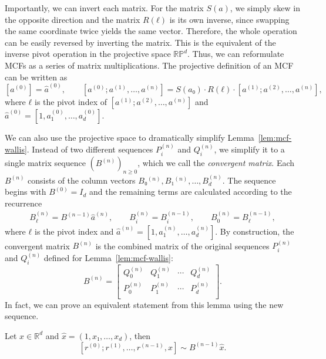 Importantly, we can invert each matrix.
For the matrix $S(a)$, we simply skew in the opposite direction
and the matrix $R(ℓ)$ is its own inverse, since swapping the same coordinate
twice yields the same vector.
Therefore, the whole operation can be easily reversed by inverting the matrix.
This is the equivalent of the inverse pivot operation in the projective space $\mathbb{RP}^d$.
Thus, we can reformulate MCFs as a series of matrix multiplications.
The projective definition of an MCF can be written as
\[
  [a^{(0)}] = \hat a^{(0)}, \qquad
  [a^{(0)}; a^{(1)}, …, a^{(n)}] = S(a₀) · R(ℓ) · [a^{(1)}; a^{(2)}, …, a^{(n)}],
\]
where $ℓ$ is the pivot index of $[a^{(1)}; a^{(2)}, …, a^{(n)}]$
and $\hat a^{(0)} = [1, a_1^{(0)}, …, a_d^{(0)}]$.

We can also use the projective space to dramatically simplify Lemma~\ref{lem:mcf-wallis}.
Instead of two different sequences $P_i^{(n)}$ and $Q_i^{(n)}$, we simplify it
to a single matrix sequence $(B^{(n)})_{n ≥ 0}$, which we call the
\emph{convergent matrix}.
Each $B^{(n)}$ consists of the column vectors $B₀^{(n)}, B₁^{(n)}, …, B_d^{(n)}$.
The sequence begins with $B^{(0)} = I_d$
and the remaining terms are calculated according to the recurrence
\begin{align*}
  B_ℓ^{(n)} = B^{(n-1)} \hat a^{(n)},
  \qquad B_i^{(n)} = B_i^{(n-1)},
  \qquad B_0^{(n)} = B_ℓ^{(n-1)},
\end{align*}
where $ℓ$ is the pivot index and $\hat a^{(n)} = [1, a_1^{(n)}, …, a_d^{(n)}]$.
By construction, the convergent matrix $B^{(n)}$ is the combined matrix of the original sequences
$P_i^{(n)}$ and $Q_i^{(n)}$ defined for Lemma~\vref{lem:mcf-wallis}:
\[
  B^{(n)} = \begin{bmatrix}
    Q_0^{(n)} & Q_1^{(n)} & ⋯ & Q_d^{(n)} \\
    P_0^{(n)} & P_1^{(n)} & ⋯ & P_d^{(n)} \\
  \end{bmatrix}.
\]
In fact, we can prove an equivalent statement from this lemma using the new sequence.

\begin{lemma}
  \label{lem:mcf-wallis'}
  Let $x ∈ ℝ^d$ and $\hat x = (1, x₁, …, x_d)$, then
  \[
    [r^{(0)}; r^{(1)}, …, r^{(n-1)}, x] \sim B^{(n-1)} \hat x.
  \]
\end{lemma}


